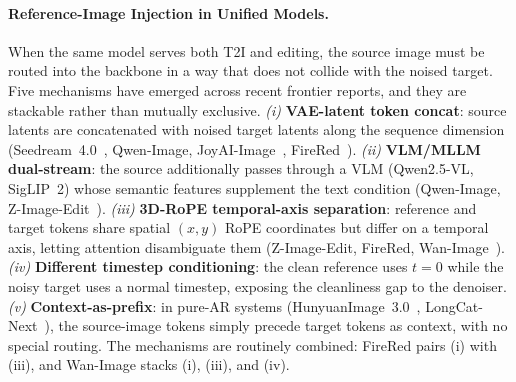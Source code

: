 \documentclass{llmxive}
\begin{document}
\paragraph{Reference-Image Injection in Unified Models.}
When the same model serves both T2I and editing, the source image must be routed into the backbone in a way that does not collide with the noised target. Five mechanisms have emerged across recent frontier reports, and they are stackable rather than mutually exclusive. \emph{(i)} \textbf{VAE-latent token concat}: source latents are concatenated with noised target latents along the sequence dimension (Seedream~4.0~\citep{seedream2025seedream}, Qwen-Image, JoyAI-Image~\citep{jdjoyaiimage}, FireRed~\citep{team2026firered}). \emph{(ii)} \textbf{VLM/MLLM dual-stream}: the source additionally passes through a VLM (Qwen2.5-VL, SigLIP~2) whose semantic features supplement the text condition (Qwen-Image, Z-Image-Edit~\citep{cai2025z}). \emph{(iii)} \textbf{3D-RoPE temporal-axis separation}: reference and target tokens share spatial $(x,y)$ RoPE coordinates but differ on a temporal axis, letting attention disambiguate them (Z-Image-Edit, FireRed, Wan-Image~\citep{mao2026wan}). \emph{(iv)} \textbf{Different timestep conditioning}: the clean reference uses $t{=}0$ while the noisy target uses a normal timestep, exposing the cleanliness gap to the denoiser. \emph{(v)} \textbf{Context-as-prefix}: in pure-AR systems (HunyuanImage~3.0~\citep{cao2025hunyuanimage}, LongCat-Next~\citep{team2026longcat}), the source-image tokens simply precede target tokens as context, with no special routing. The mechanisms are routinely combined: FireRed pairs (i) with (iii), and Wan-Image stacks (i), (iii), and (iv).
\end{document}
